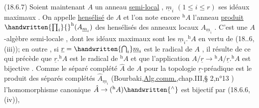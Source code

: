 (18.6.7) Soient maintenant $A$ un anneau \uline{semi-local} , $\underline m_i$ $(1\leq i\leq r)$ ses idéaux
maximaux . On appelle \uline{hensélisé} de $A$ et l'on note encore $ {}^{\mathrm h}A$ l'anneau \uline{produit}
$\handwritten{\prod_i}{}^{\mathrm h}(A_{\underline m_i})$ des hensélisés des anneaux locaux $A_{\underline m_i}$ . C'est  une $A$-algèbre semi-locale
, dont les idéaux maximaux sont les $\underline m_i.{}^{\mathrm h}A$ en vertu de (18..6,(iii));
en outre , si $\underline r=\handwritten{\bigcap_i}\underline m_i$ est le radical de $A$ , il résulte de ce qui précède
que $\underline r.{}^{\mathrm h}A$ est le radical de $ {}^{\mathrm h}A$ et que l'application $A/\underline r\to{}^{\mathrm h}A/\underline r.{}^{\mathrm h}A$ est bijective
. Comme le séparé complété $\hat A$ de $A$ pour la topologie $\underline r$-préadique est le
produit des séparés complétés $\hat A_{\underline m_i}$ (Bourbaki,\uline{Alg.comm.},chap.III,§ 2,n°13 ) l'homomorphisme canonique $\hat A\to({}^{\mathrm h}A)\handwritten{{}^{\wedge}}$ est bijectif par (18.6.6,(iv)),
